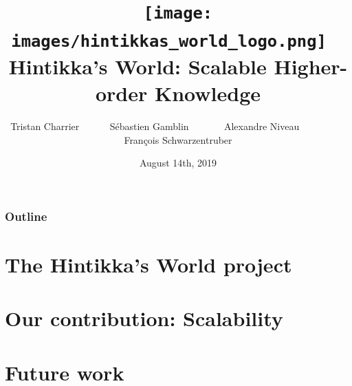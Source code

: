 \documentclass[10pt]{beamer}
\title{\texttt{[image: images/hintikkas\_world\_logo.png]} 
	~
	\\
	Hintikka's World: Scalable Higher-order Knowledge}%
\author{Tristan Charrier ~~~~~ Sébastien Gamblin ~~~~~~ Alexandre Niveau ~~~~~~~~~ François Schwarzentruber}
\institute{\texttt{[image: logoens.png]} \\ École Normale Supérieure Rennes}
\date{August 14th, 2019}
\begin{document}
\begin{frame}
\titlepage
\end{frame}



\begin{frame}
\frametitle{Outline}
\tableofcontents[hideallsubsections]
\end{frame}

\section{The Hintikka's World project}


\section{Our contribution: Scalability}


\section{Future work}


%
%
%
%
%
%
%
%
\end{document}
